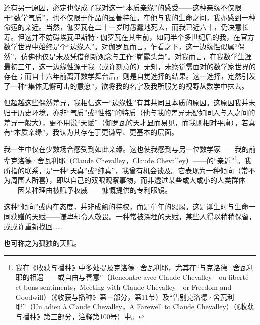 还有另一原因，必定也促成了我对这一“本质亲缘”的感受——这种亲缘不仅限于“数学气质”，也不仅限于作品的显著特征。在他与我的生命之间，我亦感到一种命运的亲近。当然，伽罗瓦在二十一岁时愚蠢地死去，而我已近六十，仍决意长寿。但这并不妨碍埃瓦里斯特·伽罗瓦在其生前，如同半个多世纪后的我，在官方数学世界中始终是个“边缘人”。对伽罗瓦而言，乍看之下，这一边缘性似属“偶然”，仿佛他仅是未及凭借创新观念与工作“崭露头角”。对我而言，在我数学生涯最初三年，这一边缘性源于我（或许刻意的）无知，未察觉需面对的数学家世界的存在；而自十六年前离开数学舞台后，则是自觉选择的结果。这一选择，定然引发了一种“集体无懈可击的意愿”，欲将我的名字及我所服务的视野从数学中抹去。

但超越这些偶然差异，我相信这一“边缘性”有其共同且本质的原因。这原因我并未归于历史环境，亦非“气质”或“性格”的特质（他与我的差异无疑如同人与人之间的差异一般大），更不用说“天赋”（伽罗瓦的天才显而易见，而我则相对平庸）。若真有“本质亲缘”，我认为其存在于更谦卑、更基本的层面。

我一生中仅在少数场合感受到如此亲缘。这也使我感到与另一位数学家——我的前辈克洛德·舍瓦利耶（Claude Chevalley，Claude Chevalley）——的“亲近”\footnote{我在《收获与播种》中多处提及克洛德·舍瓦利耶，尤其在“与克洛德·舍瓦利耶的相遇——或自由与善意”（Rencontre avec Claude Chevalley - ou liberté et bons sentiments，Meeting with Claude Chevalley - or Freedom and Goodwill）（《收获与播种》第一部分，第11节）及“告别克洛德·舍瓦利耶”（Un adieu à Claude Chevalley，A Farewell to Claude Chevalley）（《收获与播种》第三部分，注释第100号）中。}。我所指的联系，是一种“天真”或“纯真”，我曾有机会谈及。它表现为一种倾向（常不为周围人所喜），即以自己的双眼观察事物，而非透过某些或大或小的人类群体——因某种理由被赋予权威——慷慨提供的专利眼镜。

这种“倾向”或内在态度，并非成熟的特权，而是童年的恩赐。这是诞生时与生命一同获赠的天赋——谦卑却令人敬畏。一种常被深埋的天赋，某些人得以稍稍保留，或或许重新找回……

也可称之为孤独的天赋。